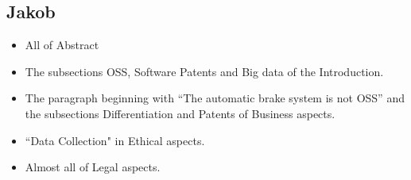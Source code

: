 \documentclass[conference]{IEEEtran}
\begin{document}
\subsection{Jakob}
\begin{itemize}
	\item
	All of Abstract
	\item
	The subsections OSS, Software Patents and Big data of the Introduction.
	\item
	The paragraph beginning with ``The automatic brake system is not OSS'' and the subsections Differentiation and Patents of Business aspects.
	\item
	``Data Collection" in Ethical aspects.
	\item
	Almost all of Legal aspects.
\end{itemize}
\end{document}
